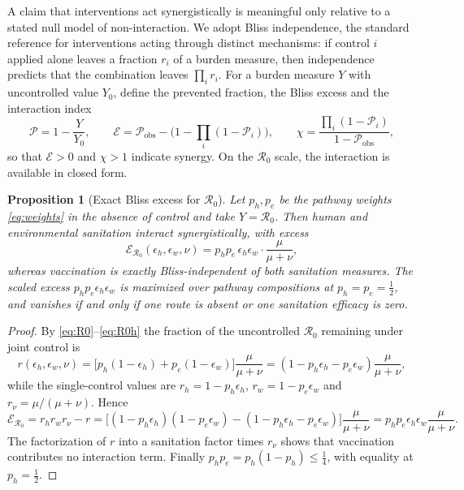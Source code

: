 \documentclass[11pt]{article}
\theoremstyle{plain}
\newtheorem{proposition}[theorem]{Proposition}
\theoremstyle{definition}
\theoremstyle{remark}
\newcommand{\Rz}{\mathcal{R}_0}
\begin{document}
A claim that interventions act synergistically is meaningful only relative to a stated null model of non-interaction. We adopt Bliss independence, the standard reference for interventions acting through distinct mechanisms: if control $i$ applied alone leaves a fraction $r_i$ of a burden measure, then independence predicts that the combination leaves $\prod_i r_i$. For a burden measure $Y$ with uncontrolled value $Y_0$, define the prevented fraction, the Bliss excess and the interaction index
\begin{equation}\label{eq:PF}
\mathcal{P}=1-\frac{Y}{Y_0},\qquad
\mathcal{E}=\mathcal{P}_{\mathrm{obs}}-\Big(1-\prod_i(1-\mathcal{P}_i)\Big),\qquad
\chi=\frac{\prod_i(1-\mathcal{P}_i)}{1-\mathcal{P}_{\mathrm{obs}}},
\end{equation}
so that $\mathcal{E}>0$ and $\chi>1$ indicate synergy. On the $\Rz$ scale, the interaction is available in closed form.

\begin{proposition}[Exact Bliss excess for $\Rz$]\label{prop:synergy}
Let $p_h,p_e$ be the pathway weights \eqref{eq:weights} in the absence of control and take $Y=\Rz$. Then human and environmental sanitation interact synergistically, with excess
\begin{equation}\label{eq:blissR0}
\mathcal{E}_{\Rz}(\epsilon_h,\epsilon_w,\nu)=p_hp_e\,\epsilon_h\epsilon_w\cdot\frac{\mu}{\mu+\nu},
\end{equation}
whereas vaccination is exactly Bliss-independent of both sanitation measures. The scaled excess $p_hp_e\epsilon_h\epsilon_w$ is maximized over pathway compositions at $p_h=p_e=\tfrac12$, and vanishes if and only if one route is absent or one sanitation efficacy is zero.
\end{proposition}

\begin{proof}
By \eqref{eq:R0}--\eqref{eq:R0h} the fraction of the uncontrolled $\Rz$ remaining under joint control is
\[
r(\epsilon_h,\epsilon_w,\nu)=\big[p_h(1-\epsilon_h)+p_e(1-\epsilon_w)\big]\frac{\mu}{\mu+\nu}
=(1-p_h\epsilon_h-p_e\epsilon_w)\frac{\mu}{\mu+\nu},
\]
while the single-control values are $r_h=1-p_h\epsilon_h$, $r_w=1-p_e\epsilon_w$ and $r_\nu=\mu/(\mu+\nu)$. Hence
\[
\mathcal{E}_{\Rz}=r_hr_wr_\nu-r=\big[(1-p_h\epsilon_h)(1-p_e\epsilon_w)-(1-p_h\epsilon_h-p_e\epsilon_w)\big]\frac{\mu}{\mu+\nu}
=p_hp_e\epsilon_h\epsilon_w\frac{\mu}{\mu+\nu}.
\]
The factorization of $r$ into a sanitation factor times $r_\nu$ shows that vaccination contributes no interaction term. Finally $p_hp_e=p_h(1-p_h)\le\tfrac14$, with equality at $p_h=\tfrac12$.
\end{proof}
\end{document}
